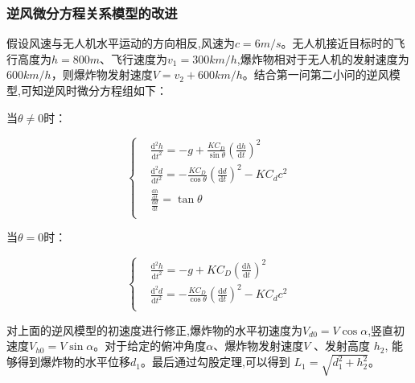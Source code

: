 \documentclass[normalsize]{ctexart}
\begin{document}
\subsubsection{逆风微分方程关系模型的改进}
假设风速与无人机水平运动的方向相反,风速为$c=6m/s$。无人机接近目标时的飞行高度为$h=800m$、飞行速度为$v_1=300km/h$,爆炸物相对于无人机的发射速度为$600km/h$，则爆炸物发射速度$V=v_2+600km/h$。结合第一问第二小问的逆风模型,可知逆风时微分方程组如下：
\begin{center}
	当$\theta\neq0$时：
\end{center}
\begin{equation}
	\begin{cases}
		& \frac{\mathrm{d}^2h}{\mathrm{d}t^2}=-g+\frac{KC_D}{\sin\theta}(\frac{\mathrm{d}h}{\mathrm{d}t})^2\\
		& \frac{\mathrm{d}^2d}{\mathrm{d}t^2}=-\frac{KC_D}{\cos\theta}(\frac{\mathrm{d}d}{\mathrm{d}t})^2-{KC_d}c^2\\
		& \frac{\frac{\mathrm{d}h}{\mathrm{d}t}}{\frac{\mathrm{d}d}{\mathrm{d}t}}=\tan\theta\\
	\end{cases}
\end{equation}
\begin{center}
	当$\theta=0$时：
\end{center}
\begin{equation}
	\begin{cases}
		& \frac{\mathrm{d}^2h}{\mathrm{d}t^2}=-g+KC_D(\frac{\mathrm{d}h}{\mathrm{d}t})^2\\
		& \frac{\mathrm{d}^2d}{\mathrm{d}t^2}=-\frac{KC_D}{\cos\theta}(\frac{\mathrm{d}d}{\mathrm{d}t})^2-{KC_d}c^2\\
	\end{cases}
\end{equation}
\par 对上面的逆风模型的初速度进行修正,爆炸物的水平初速度为$V_{d0}=V\cos\alpha$,竖直初速度$V_{h0}=V\sin\alpha$。对于给定的俯冲角度$α$、爆炸物发射速度$V$ 、发射高度 $h_2$, 能够得到爆炸物的水平位移$d_1$。最后通过勾股定理,可以得到 $L_1 = \sqrt{d_1^2 + h_2^2} $。
\end{document}
